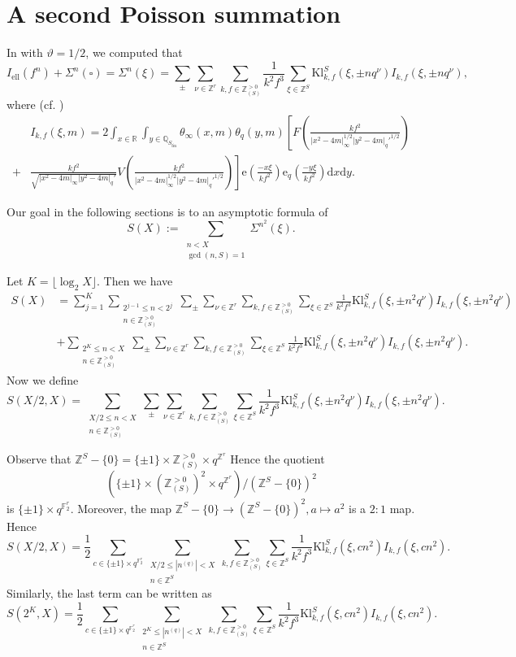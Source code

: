 \documentclass[10pt,oneside,reqno]{amsart}
\newcommand\rmd{\mathrm{d}}
\newcommand\rme{\mathrm{e}}
\newcommand\FF{\mathbb{F}}
\newcommand\QQ{\mathbb{Q}}
\newcommand\RR{\mathbb{R}}
\newcommand\ZZ{\mathbb{Z}}
\newcommand\fin{\mathrm{fin}}
\newcommand\el{\mathrm{ell}}
\newcommand\Kl{\mathrm{Kl}}
\renewcommand\leq{\leqslant}
\newcommand\legendresymbol[2]{\genfrac{(}{)}{}{}{#1}{#2}}
\theoremstyle{THEOREM}
\theoremstyle{DEFINITION}
\theoremstyle{EXERCISE}
\numberwithin{equation}{section}
\begin{document}
\section{A second Poisson summation}\label{sec:secondpoisson}
In \cite[Section 4]{cheng2025} with $\vartheta=1/2$, we computed that
\[
I_{\el}(f^n)+\Sigma^n(\square)=\Sigma^n(\xi)=\sum_{\pm}\sum_{\nu\in \ZZ^r}\sum_{k,f\in \ZZ_{(S)}^{>0}}\frac{1}{k^2f^3}\sum_{\xi\in \ZZ^S}\Kl_{k,f}^S(\xi, \pm nq^\nu)I_{k,f}(\xi, \pm nq^\nu),
\]
where (cf. \cite[Section 3]{cheng2025c})
\begin{align*}
&I_{k,f}(\xi,m)=2\int_{x\in\RR}\int_{y\in\QQ_{S_\fin}}\theta_\infty(x,m)\theta_{q}(y, m)\left[F\legendresymbol{kf^2}{|x^2-4m|_\infty^{1/2}|y^2-4m|_q'^{1/2}}\right.\\
+&\left.\frac{kf^2}{\sqrt{|x^2-4m|_\infty|y^2-4m|_q'}} V\legendresymbol{kf^2}{|x^2-4m|_\infty^{1/2} |y^2- 4m|_q'^{1/2}}\right]\rme\legendresymbol{-x\xi }{kf^2}\rme_{q}\legendresymbol{-y\xi}{kf^2}\rmd x\rmd y.
\end{align*}

Our goal in the following sections is to an asymptotic formula of
\[
S(X):=\sum_{\substack{n<X \\ \gcd(n,S)=1}}\Sigma^{n^2}(\xi).
\]

Let $K=\lfloor\log_2 X\rfloor$. Then we have
\begin{align*}
  S(X) & =\sum_{j=1}^{K}\sum_{\substack{2^{j-1}\leq n<2^{j}\\n\in \ZZ_{(S)}^{>0}}}\sum_{\pm}\sum_{\nu\in \ZZ^r}\sum_{k,f\in \ZZ_{(S)}^{>0}}\sum_{\xi\in \ZZ^S}\frac{1}{k^2f^3}\Kl_{k,f}^S(\xi,\pm n^2q^\nu)I_{k,f}(\xi,\pm n^2q^\nu)\\
  &+\sum_{\substack{2^{K}\leq n<X\\n\in \ZZ_{(S)}^{>0}}}\sum_{\pm}\sum_{\nu\in \ZZ^r}\sum_{k,f\in \ZZ_{(S)}^{>0}}\sum_{\xi\in \ZZ^S}\frac{1}{k^2f^3}\Kl_{k,f}^S(\xi,\pm n^2q^\nu)I_{k,f}(\xi,\pm n^2q^\nu).
\end{align*}
Now we define
\[
S(X/2,X)=\sum_{\substack{X/2\leq n<X\\n\in \ZZ_{(S)}^{>0}}}\sum_{\pm}\sum_{\nu\in \ZZ^r}\sum_{k,f\in \ZZ_{(S)}^{>0}}\sum_{\xi\in \ZZ^S}\frac{1}{k^2f^3}\Kl_{k,f}^S(\xi,\pm n^2q^\nu)I_{k,f}(\xi,\pm n^2q^\nu).
\]

Observe that $\ZZ^S-\{0\}=\{\pm 1\}\times \ZZ_{(S)}^{>0}\times q^{\ZZ^r}$ Hence the quotient
\[
(\{\pm 1\}\times (\ZZ_{(S)}^{>0})^2\times q^{\ZZ^r})/(\ZZ^S-\{0\})^2
\]
is $\{\pm 1\}\times q^{\FF_2^r}$. Moreover, the map $\ZZ^S-\{0\}\to(\ZZ^S-\{0\})^2, a\mapsto a^2$ is a $2:1$ map. Hence
\[
S(X/2,X)=\frac12\sum_{c\in \{\pm 1\}\times q^{\FF_2^r}}\sum_{\substack{X/2\leq |n^{(q)}|<X\\n\in \ZZ^S}}\sum_{k,f\in \ZZ_{(S)}^{>0}}\sum_{\xi\in \ZZ^S}\frac{1}{k^2f^3}\Kl_{k,f}^S(\xi,cn^2)I_{k,f}(\xi,cn^2).
\]
Similarly, the last term can be written as
\[
S(2^K,X)=\frac12\sum_{c\in \{\pm 1\}\times q^{\FF_2^r}}\sum_{\substack{2^{K}\leq |n^{(q)}|<X\\n\in \ZZ^S}}\sum_{k,f\in \ZZ_{(S)}^{>0}}\sum_{\xi\in \ZZ^S}\frac{1}{k^2f^3}\Kl_{k,f}^S(\xi,cn^2)I_{k,f}(\xi,cn^2).
\]
\end{document}
